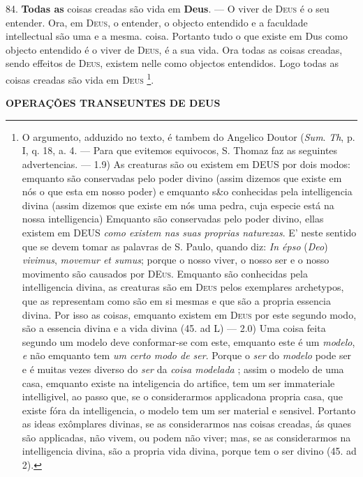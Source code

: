84. \textbf{Todas as} coisas creadas são vida em \textbf{Deus}. --- O viver de \textsc{Deus} é o seu entender. Ora, em \textsc{Deus}, o entender, o objecto entendido e a faculdade intellectual são uma e a mesma. coisa. Portanto tudo o que existe em Dus como objecto entendido é o viver de \textsc{Deus}, é a sua vida. Ora todas as coisas creadas, sendo effeitos de \textsc{Deus}, existem nelle como objectos entendidos. Logo todas as coisas creadas são vida em \textsc{Deus} \footnote{O argumento, adduzido no texto, é tambem do Angelico Doutor (\emph{Sum}. \emph{Th}, p. I, q. 18, a. 4. --- Para que evitemos equivocos, S. Thomaz faz as seguintes advertencias. --- 1.9) As creaturas são ou existem em \textsc{DEUS} por dois modos: emquanto são conservadas pelo poder divino (assim dizemos que existe em nós o que esta em nosso poder) e emquanto s\&o conhecidas pela intelligencia divina (assim dizemos que existe em nós uma pedra, cuja especie está na nossa intelligencia) Emquanto são conservadas pelo poder divino, ellas existem em \textsc{DEUS} \emph{como existem nas suas proprias naturezas}. E' neste sentido que se devem tomar as palavras de S. Paulo, quando diz: \emph{In épso} (\emph{Deo}) \emph{vivimus}, \emph{movemur et sumus}; porque o nosso viver, o nosso ser e o nosso movimento são causados por \textsc{DEus}. Emquanto são conhecidas pela intelligencia divina, as creaturas são em \textsc{Deus} pelos exemplares archetypos, que as representam como são em si mesmas e que são a propria essencia divina. Por isso as coisas, emquanto existem em \textsc{Deus} por este segundo modo, são a essencia divina e a vida divina (45. ad L) --- 2.0) Uma coisa feita segundo um modelo deve conformar-se com este, emquanto este é um \emph{modelo}, \emph{e} não emquanto tem \emph{um certo modo de ser}. Porque o \emph{ser} do \emph{modelo} pode ser e é muitas vezes diverso do \emph{ser} da \emph{coisa modelada} ; assim o modelo de uma casa, emquanto existe na inteligencia do artifice, tem um ser immateriale intelligivel, ao passo que, se o considerarmos applicadona propria casa, que existe fóra da intelligencia, o modelo tem um ser material e sensivel. Portanto as ideas exômplares divinas, se as considerarmos nas coisas creadas, ás quaes são applicadas, não vivem, ou podem não viver; mas, se as considerarmos na intelligencia divina, são a propria vida divina, porque tem o ser divino (45. ad 2).}.

 \textbf{OPERAÇÕES TRANSEUNTES DE DEUS}


